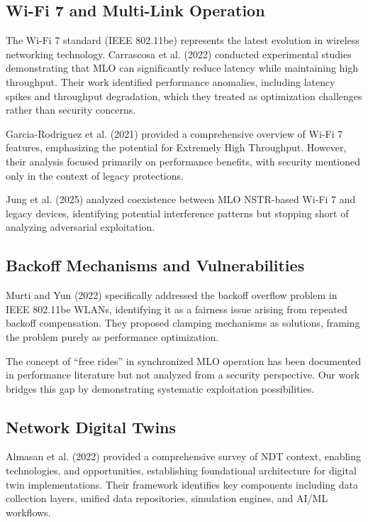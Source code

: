 \documentclass[12pt,a4paper]{article}
\begin{document}
\subsection{Wi-Fi 7 and Multi-Link Operation}

The Wi-Fi 7 standard (IEEE 802.11be) represents the latest evolution in wireless networking technology. Carrascosa et al. (2022) conducted experimental studies demonstrating that MLO can significantly reduce latency while maintaining high throughput. Their work identified performance anomalies, including latency spikes and throughput degradation, which they treated as optimization challenges rather than security concerns.

Garcia-Rodriguez et al. (2021) provided a comprehensive overview of Wi-Fi 7 features, emphasizing the potential for Extremely High Throughput. However, their analysis focused primarily on performance benefits, with security mentioned only in the context of legacy protections.

Jung et al. (2025) analyzed coexistence between MLO NSTR-based Wi-Fi 7 and legacy devices, identifying potential interference patterns but stopping short of analyzing adversarial exploitation.

\subsection{Backoff Mechanisms and Vulnerabilities}

Murti and Yun (2022) specifically addressed the backoff overflow problem in IEEE 802.11be WLANs, identifying it as a fairness issue arising from repeated backoff compensation. They proposed clamping mechanisms as solutions, framing the problem purely as performance optimization.

The concept of ``free rides'' in synchronized MLO operation has been documented in performance literature but not analyzed from a security perspective. Our work bridges this gap by demonstrating systematic exploitation possibilities.

\subsection{Network Digital Twins}

Almasan et al. (2022) provided a comprehensive survey of NDT context, enabling technologies, and opportunities, establishing foundational architecture for digital twin implementations. Their framework identifies key components including data collection layers, unified data repositories, simulation engines, and AI/ML workflows.
\end{document}

